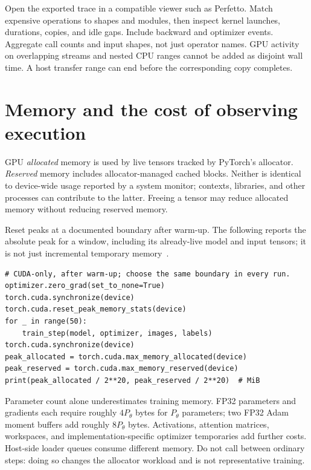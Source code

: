 \documentclass[11pt,a4paper,oneside]{report}
\newcommand{\code}[1]{\texttt{\detokenize{#1}}}
\begin{document}
Open the exported trace in a compatible viewer such as Perfetto. Match
expensive operations to shapes and modules, then inspect kernel launches,
durations, copies, and idle gaps. Include backward and optimizer events.
Aggregate call counts and input shapes, not just operator names. GPU activity
on overlapping streams and nested CPU ranges cannot be added as disjoint wall
time. A host transfer range can end before the corresponding copy completes.

\newpage
\section{Memory and the cost of observing execution}
GPU \emph{allocated} memory is used by live tensors tracked by PyTorch's
allocator. \emph{Reserved} memory includes allocator-managed cached blocks.
Neither is identical to device-wide usage reported by a system monitor;
contexts, libraries, and other processes can contribute to the latter.
Freeing a tensor may reduce allocated memory without reducing reserved memory.

Reset peaks at a documented boundary after warm-up. The following reports
the absolute peak for a window, including its already-live model and input
tensors; it is not just incremental temporary memory~\cite{memoryapi}.
\begin{lstlisting}[style=python]
# CUDA-only, after warm-up; choose the same boundary in every run.
optimizer.zero_grad(set_to_none=True)
torch.cuda.synchronize(device)
torch.cuda.reset_peak_memory_stats(device)
for _ in range(50):
    train_step(model, optimizer, images, labels)
torch.cuda.synchronize(device)
peak_allocated = torch.cuda.max_memory_allocated(device)
peak_reserved = torch.cuda.max_memory_reserved(device)
print(peak_allocated / 2**20, peak_reserved / 2**20)  # MiB
\end{lstlisting}

Parameter count alone underestimates training memory. FP32 parameters and
gradients each require roughly $4P_\theta$ bytes for $P_\theta$ parameters;
two FP32 Adam moment buffers add roughly $8P_\theta$ bytes. Activations,
attention matrices, workspaces, and implementation-specific optimizer
temporaries add further costs. Host-side loader queues consume different memory.
Do not call \code{empty_cache()} between ordinary steps: doing so changes the
allocator workload and is not representative training.
\end{document}

